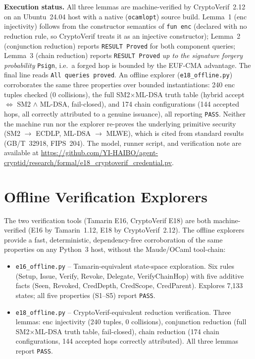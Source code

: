 \documentclass[10pt,twocolumn]{IEEEtran}
\begin{document}
\begin{appendices}
\noindent\textbf{Execution status.} All three lemmas are machine-verified
by CryptoVerif~2.12 on an Ubuntu~24.04 host with a native
(\texttt{ocamlopt}) source build. Lemma~1 (enc injectivity) follows
from the constructor semantics of \texttt{fun enc} (declared with no
reduction rule, so CryptoVerif treats it as an injective constructor);
Lemma~2 (conjunction reduction) reports \texttt{RESULT Proved} for
both component queries; Lemma~3 (chain reduction) reports
\texttt{RESULT Proved} \emph{up to the signature forgery probability}
\texttt{Psign}, i.e.\ a forged hop is bounded by the EUF-CMA advantage.
The final line reads \texttt{All queries proved}. An offline explorer
(\texttt{e18\_offline.py}) corroborates the same three properties over
bounded instantiations: 240 enc tuples checked (0 collisions), the full
SM2$\times$ML-DSA truth table (hybrid accept $\iff$ SM2 $\land$ ML-DSA,
fail-closed), and 174 chain configurations (144 accepted hops, all
correctly attributed to a genuine issuance), all reporting
\texttt{PASS}. Neither the machine run nor the explorer re-proves the
underlying primitive security (SM2 $\rightarrow$ ECDLP,
ML-DSA $\rightarrow$ MLWE), which is cited from standard results
(GB/T~32918, FIPS~204). The model, runner script, and verification
note are available at
\url{https://github.com/YI-HAIBO/agent-cryptid/research/formal/e18\_cryptoverif\_credential.pv}.

\section{Offline Verification Explorers}
\label{app:offline}

The two verification tools (Tamarin E16, CryptoVerif E18) are both
machine-verified (E16 by Tamarin~1.12, E18 by CryptoVerif~2.12). The
offline explorers provide a fast, deterministic, dependency-free
corroboration of the same properties on any Python~3 host, without the
Maude/OCaml tool-chain:

\begin{itemize}
  \item \texttt{e16\_offline.py} -- Tamarin-equivalent state-space
    exploration. Six rules (Setup, Issue, Verify, Revoke, Delegate,
    VerifyChainHop) with five additive facts (Seen, Revoked, CredDepth,
    CredScope, CredParent). Explores 7,133 states; all five properties
    (S1--S5) report \texttt{PASS}.
  \item \texttt{e18\_offline.py} -- CryptoVerif-equivalent reduction
    verification. Three lemmas: enc injectivity (240 tuples, 0
    collisions), conjunction reduction (full SM2$\times$ML-DSA truth
    table, fail-closed), chain reduction (174 chain configurations,
    144 accepted hops correctly attributed). All three lemmas report
    \texttt{PASS}.
\end{itemize}


\end{appendices}
\end{document}
